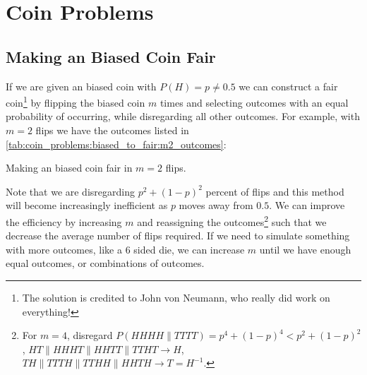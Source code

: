 \section{Coin Problems}
\label{stats:coin_problems}

\subsection{Making an Biased Coin Fair}
\label{stats:coin_problems:biased_to_fair}

If we are given an biased coin with $P\left(H\right) = p \neq \num{0.5}$
we can construct a fair coin\footnote{The solution is credited to John von Neumann, who really did work on everything!} by
flipping the biased coin $m$ times and selecting outcomes with an equal probability of occurring, while disregarding all other outcomes.
For example, with $m=2$ flips we have the outcomes listed in \cref{tab:coin_problems:biased_to_fair:m2_outcomes}:

\begin{table}[H]
\centering
\begingroup
\renewcommand*{\arraystretch}{1}

\endgroup
\caption{
Making an biased coin fair in $m=2$ flips.
}
\label{tab:coin_problems:biased_to_fair:m2_outcomes}
\end{table}

Note that we are disregarding $p^{2} + \left(1-p\right)^{2}$ percent of flips
and this method will become increasingly inefficient as $p$ moves away from $\num{0.5}$.
We can improve the efficiency by increasing $m$ and reassigning the
outcomes\footnote{For $m = \num{4}$, disregard $P\left(HHHH \parallel TTTT\right) = p^{4} + \left(1-p\right)^{4} < p^{2} + \left(1-p\right)^{2}$,\newline
$HT \parallel HHHT \parallel HHTT \parallel TTHT \to H$,\newline
$TH \parallel TTTH \parallel TTHH \parallel HHTH \to T = H^{-1}$.} such that
we decrease the average number of flips required.
If we need to simulate something with more outcomes, like a 6 sided die,
we can increase $m$ until we have enough equal outcomes, or combinations of outcomes.

